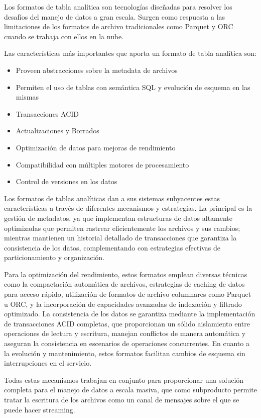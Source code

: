 Los formatos de tabla analítica son tecnologías diseñadas para resolver los desafíos del manejo de datos
a gran escala. Surgen como respuesta a las limitaciones de los formatos de archivo tradicionales como Parquet y ORC
cuando se trabaja con ellos en la nube. 

Las características más importantes que aporta un formato de tabla analítica son:

\begin{itemize}
    \item Proveen abstracciones sobre la metadata de archivos
    \item Permiten el uso de tablas con semántica SQL y evolución de esquema en las mismas
    \item Transacciones ACID
    \item Actualizaciones y Borrados
    \item Optimización de datos para mejoras de rendimiento
    \item Compatibilidad con múltiples motores de procesamiento
    \item Control de versiones en los datos
\end{itemize}

Los formatos de tablas analíticas dan a sus sistemas subyacentes estas características a través de diferentes mecanismos y estrategias. 
La principal es la gestión de metadatos, ya que implementan estructuras de datos altamente optimizadas que permiten rastrear 
eficientemente los archivos y sus cambios; mientras mantienen un historial detallado de transacciones que garantiza la consistencia de los datos, 
complementando con estrategias efectivas de particionamiento y organización. 

Para la optimización del rendimiento, estos formatos emplean diversas técnicas como la compactación automática de archivos, 
estrategias de caching de datos para acceso rápido, utilización de formatos de archivo columnares como Parquet u ORC, 
y la incorporación de capacidades avanzadas de indexación y filtrado optimizado. 
La consistencia de los datos se garantiza mediante la implementación de transacciones ACID completas, 
que proporcionan un sólido aislamiento entre operaciones de lectura y escritura, manejan conflictos de manera automática 
y aseguran la consistencia en escenarios de operaciones concurrentes. 
En cuanto a la evolución y mantenimiento, estos formatos facilitan cambios de esquema sin interrupciones en el servicio. 

Todas estas mecanismos trabajan en conjunto para proporcionar una solución completa para el manejo de datos a escala masiva,
que como subproducto permite tratar la escritura de los archivos como un canal de mensajes sobre el que se puede hacer streaming.


